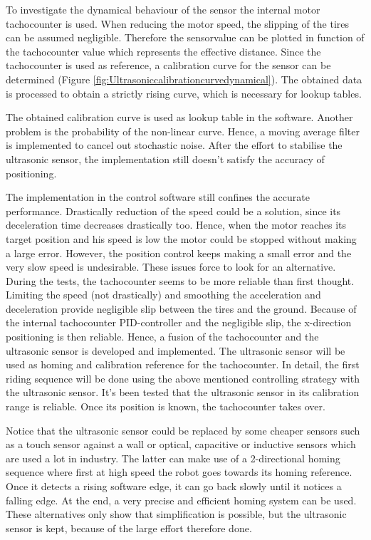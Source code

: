 \documentclass{article}
\begin{document}
	\par To investigate the dynamical behaviour of the sensor the internal motor tachocounter is used. When reducing the motor speed, the slipping of the tires can be assumed negligible. Therefore the sensorvalue can be plotted in function of the tachocounter value which represents the effective distance. Since the tachocounter is used as reference, a calibration curve for the sensor can be determined (Figure \ref{fig:Ultrasoniccalibrationcurvedynamical}). The obtained data is processed to obtain a strictly rising curve, which is necessary for lookup tables.
	
	\par The obtained calibration curve is used as lookup table in the software. Another problem is the probability of the non-linear curve. Hence, a moving average filter is implemented to cancel out stochastic noise. After the effort to stabilise the ultrasonic sensor, the implementation still doesn't satisfy the accuracy of positioning. 
	
	\par The implementation in the control software still confines the accurate performance. Drastically reduction of the speed could be a solution, since its deceleration time decreases drastically too. Hence, when the motor reaches its target position and his speed is low the motor could be stopped without making a large error. However, the position control keeps making a small error and the very slow speed is undesirable. These issues force to look for an alternative. During the tests, the tachocounter seems to be more reliable than first thought. Limiting the speed (not drastically) and smoothing the acceleration and deceleration provide negligible slip between the tires and the ground. Because of the internal tachocounter PID-controller and the negligible slip, the x-direction positioning is then reliable. Hence, a fusion of the tachocounter and the ultrasonic sensor is developed and implemented. The ultrasonic sensor will be used as homing and calibration reference for the tachocounter. In detail, the first riding sequence will be done using the above mentioned controlling strategy with the ultrasonic sensor. It's been tested that the ultrasonic sensor in its calibration range is reliable. Once its position is known, the tachocounter takes over. 
	
	\par Notice that the ultrasonic sensor could be replaced by some cheaper sensors such as a touch sensor against a wall or optical, capacitive or inductive sensors which are used a lot in industry. The latter can make use of a 2-directional homing sequence where first at high speed the robot goes towards its homing reference. Once it detects a rising software edge, it can go back slowly until it notices a falling edge. At the end, a very precise and efficient homing system can be used. These alternatives only show that simplification is possible, but the ultrasonic sensor is kept, because of the large effort therefore done.
	
\end{document}
